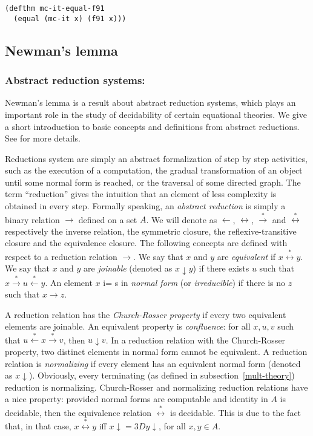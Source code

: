 \documentclass[11pt]{llncs}
\newcommand{\red}{\rightarrow}
\newcommand{\redtr}{\stackrel{*}{\red}}
\newcommand{\redi}{\leftarrow}
\newcommand{\reditr}{\stackrel{*}{\redi}}
\newcommand{\rred}{\leftrightarrow}
\newcommand{\rede}{\stackrel{*}{\rred}}
\begin{document}
{\begin{verbatim}
(defthm mc-it-equal-f91
  (equal (mc-it x) (f91 x)))
\end{verbatim}



\subsection{Newman's lemma}

\subsubsection{Abstract reduction systems:}

Newman's lemma is a result about abstract reduction systems, which plays
an important role in the study of decidability of certain equational
theories. We give a short introduction to basic concepts and definitions
from abstract reductions. See \cite{Nipkow} for more details.

Reductions system are simply an abstract formalization of step by step
activities, such as the execution of a computation, the gradual
transformation of an object until some normal form is reached, or the
traversal of some directed graph. The term ``reduction'' gives the
intuition that an element of less complexity is obtained in every step.
Formally speaking, an {\em abstract reduction} is simply a binary
relation $\red$ defined on a set $A$. We will denote as $\redi$,
$\rred$, $\redtr$ and $\rede$ respectively the inverse relation, the
symmetric closure, the reflexive-transitive closure and the equivalence
closure. The following concepts are defined with respect to a reduction
relation $\red$. We say that $x$ and $y$ are {\em equivalent} if $x\rede
y$. We say that $x$ and $y$ are {\em joinable} (denoted as $x\downarrow
y$) if there exists $u$ such that $x\redtr u \reditr y$. An element $x$ i=
s
in {\em normal form} (or {\em irreducible}) if there is no $z$ such that
$x\red z$.

A reduction relation has the {\em Church-Rosser property} if every two
equivalent elements are joinable. An equivalent property is {\em
confluence}: for all $x,u,v$ such that $u \reditr x \redtr v$, then
$u\downarrow v$. In a reduction relation with the Church-Rosser
property, two distinct elements in normal form cannot be equivalent.  A
reduction relation is {\em normalizing} if every element has an
equivalent normal form (denoted as $x\downarrow$). Obviously, every
terminating (as defined in subsection~\ref{mult-theory}) reduction is
normalizing. Church-Rosser and normalizing reduction relations have a
nice property: provided normal forms are computable and identity in $A$
is decidable, then the equivalence relation $\rede$ is decidable. This
is due to the fact that, in that case, $x \rede y$ iff $x\downarrow =3D
y\downarrow$, for all $x,y\in A$.

}
\end{document}
